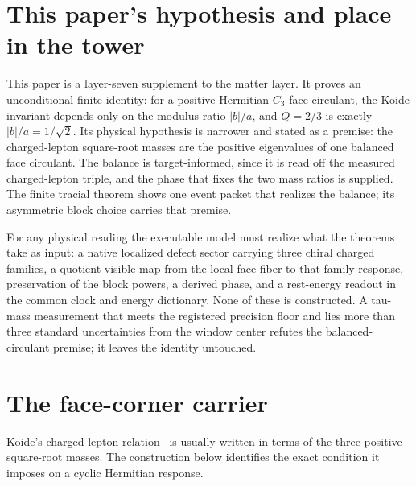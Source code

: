 \documentclass[11pt]{article}
\theoremstyle{remark}
\begin{document}
\section*{This paper's hypothesis and place in the tower}

This paper is a layer-seven supplement to the matter layer. It proves an
unconditional finite identity: for a positive Hermitian \(C_3\) face
circulant, the Koide invariant depends only on the modulus ratio
\(|b|/a\), and \(Q=2/3\) is exactly \(|b|/a=1/\sqrt2\). Its physical
hypothesis is narrower and stated as a premise: the charged-lepton
square-root masses are the positive eigenvalues of one balanced face
circulant. The balance is target-informed, since it is read off the measured
charged-lepton triple, and the phase that fixes the two mass ratios is
supplied. The finite tracial theorem shows one event packet that realizes
the balance; its asymmetric block choice carries that premise.

For any physical reading the executable model must realize what the theorems
take as input: a native localized defect sector carrying three chiral
charged families, a quotient-visible map from the local face fiber to that
family response, preservation of the block powers, a derived phase, and a
rest-energy readout in the common clock and energy dictionary. None of these
is constructed. A tau-mass measurement that meets the registered precision
floor and lies more than three standard uncertainties from the window
center refutes the balanced-circulant premise; it leaves the identity
untouched.

\section{The face-corner carrier}

Koide's charged-lepton relation~\cite{koide1983} is usually written in terms
of the three positive square-root masses. The construction below identifies
the exact condition it imposes on a cyclic Hermitian response.
\end{document}
